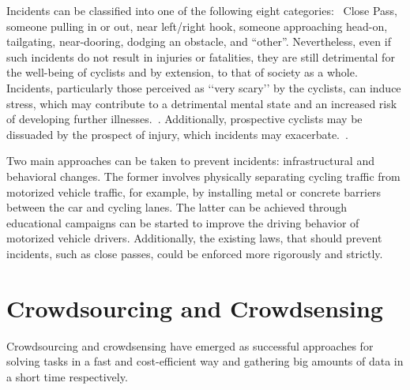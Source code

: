 Incidents can be classified into one of the following eight categories:~\cite{aldred2015investigating,aldred2016cycling,aldred2018predictors}
Close Pass, someone pulling in or out, near left/right hook, someone approaching head-on, tailgating, near-dooring, dodging an obstacle, and “other”.
Nevertheless, even if such incidents do not result in injuries or fatalities, they are still detrimental for the well-being of cyclists and by extension, to that of society as a whole.
Incidents, particularly those perceived as ‘‘very scary’’ by the cyclists, can induce stress, which may contribute to a detrimental mental state and an increased risk of developing further illnesses.~\cite{yaribeygi2017impact}.
Additionally, prospective cyclists may be dissuaded by the prospect of injury, which incidents may exacerbate.~\cite{aldred2015investigating}.

Two main approaches can be taken to prevent incidents: infrastructural and behavioral changes.
The former involves physically separating cycling traffic from motorized vehicle traffic, for example, by installing metal or concrete barriers between the car and cycling lanes.
The latter can be achieved through educational campaigns can be started to improve the driving behavior of motorized vehicle drivers.
Additionally, the existing laws, that should prevent incidents, such as close passes, could be enforced more rigorously and strictly. 


\section{Crowdsourcing and Crowdsensing}
\label{sec:crowdsourcing_crowdsensing_background}
Crowdsourcing and crowdsensing have emerged as successful approaches for solving tasks in a fast and cost-efficient way and gathering big amounts of data in a short time respectively.

